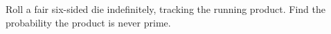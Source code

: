 Roll a fair six-sided die indefinitely, tracking the running product. Find the probability the product is never prime.
